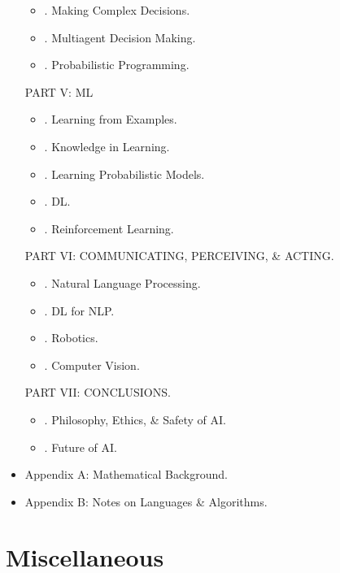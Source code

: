 \documentclass{article}
\begin{document}
\begin{itemize}
\begin{itemize}
		\item {. Making Complex Decisions.}
		\item {. Multiagent Decision Making.}
		\item {. Probabilistic Programming.}
	\end{itemize}
	PART V: ML
	\begin{itemize}
		\item {. Learning from Examples.}
		\item {. Knowledge in Learning.}
		\item {. Learning Probabilistic Models.}
		\item {. DL.}
		\item {. Reinforcement Learning.}
	\end{itemize}
	PART VI: COMMUNICATING, PERCEIVING, \& ACTING.
	\begin{itemize}
		\item {. Natural Language Processing.}
		\item {. DL for NLP.}
		\item {. Robotics.}
		\item {. Computer Vision.}
	\end{itemize}
	PART VII: CONCLUSIONS.
	\begin{itemize}
		\item {. Philosophy, Ethics, \& Safety of AI.}
		\item {. Future of AI.}
	\end{itemize}
	\item {\sf Appendix A: Mathematical Background.}
	\item {\sf Appendix B: Notes on Languages \& Algorithms.}
\end{itemize}



\section{Miscellaneous}


\printbibliography[heading=bibintoc]
	
\end{document}
